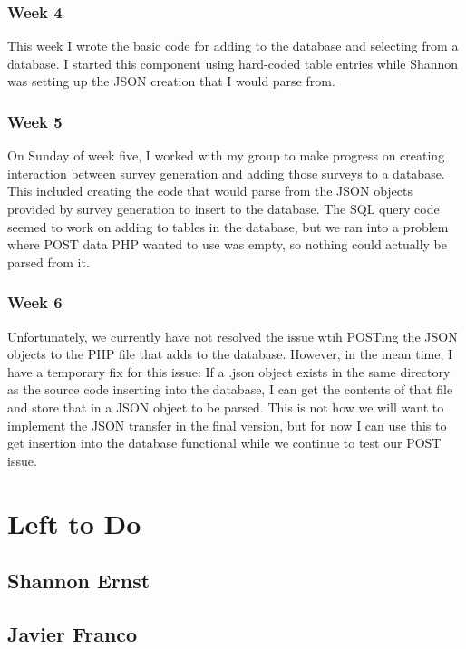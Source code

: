 \documentclass[letterpaper,10pt,serif, draftclsnofoot,onecolumn, compsoc, titlepage]{IEEEtran}
\begin{document}
\subsubsection{Week 4}
This week I wrote the basic code for adding to the database and selecting from a database.
I started this component using hard-coded table entries while Shannon was setting up the JSON creation that I would parse from.
\subsubsection{Week 5}
On Sunday of week five, I worked with my group to make progress on creating interaction between survey generation and adding those surveys to a database.
This included creating the code that would parse from the JSON objects provided by survey generation to insert to the database.
The SQL query code seemed to work on adding to tables in the database, but we ran into a problem where POST data PHP wanted to use was empty, so nothing could actually be parsed from it.
\subsubsection{Week 6}
Unfortunately, we currently have not resolved the issue wtih POSTing the JSON objects to the PHP file that adds to the database.
However, in the mean time, I have a temporary fix for this issue:
If a .json object exists in the same directory as the source code inserting into the database, I can get the contents of that file and store that in a JSON object to be parsed.
This is not how we will want to implement the JSON transfer in the final version, but for now I can use this to get insertion into the database functional while we continue to test our POST issue.

\section{Left to Do}

\subsection{Shannon Ernst}
\subsection{Javier Franco}
\end{document}
